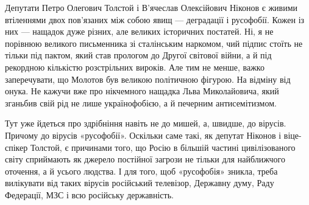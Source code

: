 Депутати Петро Олегович Толстой і В’ячеслав Олексійович Ніконов є живими
втіленнями двох пов’язаних між собою явищ — деградації і русофобії.  Кожен із
них — нащадок дуже різних, але великих історичних постатей. Ні, я не порівнюю
великого письменника зі сталінським наркомом, чий підпис стоїть не тільки під
пактом, який став прологом до Другої світової війни, а й під рекордною
кількістю розстрільних вироків.  Але тим не менше, важко заперечувати, що
Молотов був великою політичною фігурою. На відміну від онука. Не кажучи вже про
нікчемного нащадка Льва Миколайовича, який зганьбив свій рід не лише
українофобією, а й печерним антисемітизмом.

Тут уже йдеться про здрібніння навіть не до мишей, а, швидше, до вірусів.
Причому до вірусів «русофобії».  Оскільки саме такі, як депутат Ніконов і
віце-спікер Толстой, є причинами того, що Росію в більшій частині
цивілізованого світу сприймають як джерело постійної загрози не тільки для
найближчого оточення, а й усього людства. І для того, щоб «русофобія» зникла,
треба вилікувати від таких вірусів російський телевізор, Державну думу, Раду
Федерації, МЗС і всю російську державність.

